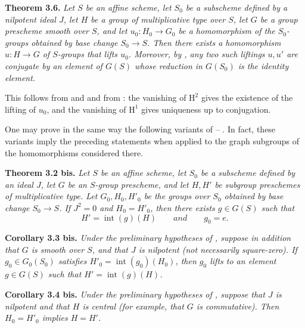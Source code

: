 \medskip
\noindent{}\textbf{Theorem 3.6.}
\textit{Let \(S\) be an affine scheme, let \(S_0\) be a subscheme defined
by a nilpotent ideal \(J\), let \(H\) be a group of multiplicative type
over \(S\), let \(G\) be a group prescheme smooth over \(S\), and let
\(u_0:H_0\to G_0\) be a homomorphism of the \(S_0\)-groups obtained by
base change \(S_0\to S\). Then there exists a homomorphism
\(u:H\to G\) of \(S\)-groups that lifts \(u_0\). Moreover, by
, any two such liftings \(u,u'\)
are conjugate by an element of \(G(S)\) whose reduction in \(G(S_0)\) is
the identity element.}

This follows from  and  and from
: the vanishing of
\(\mathrm H^2\) gives the existence of the lifting of \(u_0\), and the
vanishing of \(\mathrm H^1\) gives uniqueness up to conjugation.

One may prove in the same way the following variants of
--%
. In fact, these variants imply the
preceding statements when applied to the graph subgroups of the
homomorphisms considered there.

\medskip
\noindent{}\textbf{Theorem 3.2 bis.}
\textit{Let \(S\) be an affine scheme, let \(S_0\) be a subscheme defined
by an ideal \(J\), let \(G\) be an \(S\)-group prescheme, and let \(H,H'\)
be subgroup preschemes of multiplicative type. Let \(G_0,H_0,H'_0\) be
the groups over \(S_0\) obtained by base change \(S_0\to S\). If
\(J^2=0\) and \(H_0=H'_0\), then there exists \(g\in G(S)\) such that}
\[
  H'=\operatorname{int}(g)(H)
  \qquad\textit{and}\qquad
  g_0=e.
\]

\medskip
\noindent{}\textbf{Corollary 3.3 bis.}
\textit{Under the preliminary hypotheses of
, suppose in addition that
\(G\) is smooth over \(S\), and that \(J\) is nilpotent (not necessarily
square-zero). If \(g_0\in G_0(S_0)\) satisfies
\(H'_0=\operatorname{int}(g_0)(H_0)\), then \(g_0\) lifts to an element
\(g\in G(S)\) such that \(H'=\operatorname{int}(g)(H)\).}

\medskip
\noindent{}\textbf{Corollary 3.4 bis.}
\textit{Under the preliminary hypotheses of
, suppose that \(J\) is
nilpotent and that \(H\) is central (for example, that \(G\) is
commutative). Then \(H_0=H'_0\) implies \(H=H'\).}

